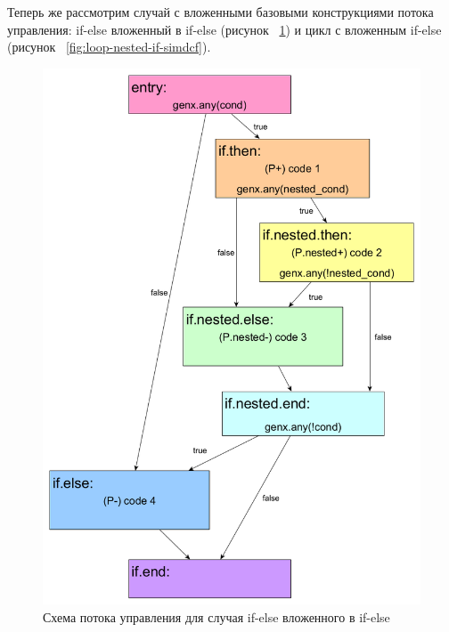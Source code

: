 Теперь же рассмотрим случай с вложенными базовыми конструкциями потока
управления: if-else вложенный в if-else (рисунок ~\ref{fig:nested-if-simdcf}) и
цикл с вложенным if-else (рисунок ~\ref{fig:loop-nested-if-simdcf}).
\begin{figure}
  \centering
  \includegraphics[scale=0.27]{Images/nested-if-FE-colored.png}
  \caption{Схема потока управления для случая if-else вложенного в if-else}
  \label{fig:nested-if-simdcf}
\end{figure}

